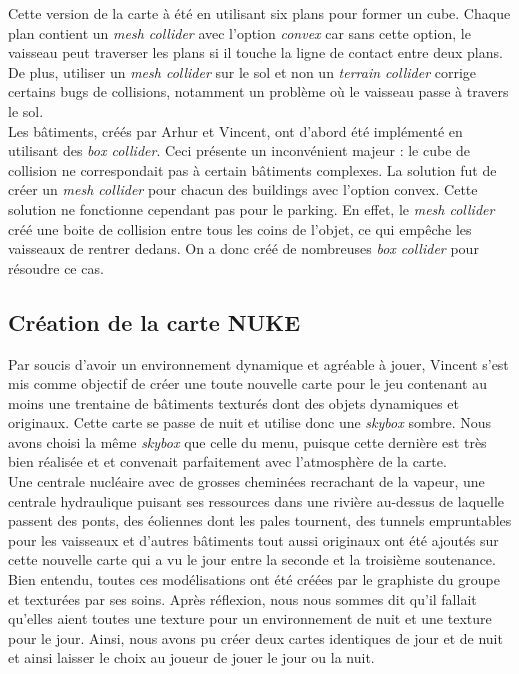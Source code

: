 \documentclass[12pt, titlepage]{article}
\begin{document}
\begin{spacing}{1.5}
Cette version de la carte à été en utilisant six plans pour former un cube. Chaque plan contient un \textit{mesh collider} avec l’option \textit{convex} car sans cette option, le vaisseau peut traverser les plans si il touche la ligne de contact entre deux plans. De plus, utiliser un \textit{mesh collider} sur le sol et non un \textit{terrain collider} corrige certains bugs de collisions, notamment un problème où le vaisseau passe à travers le sol.\\

Les bâtiments, créés par Arhur et Vincent, ont d'abord été implémenté en utilisant des \textit{box collider}. Ceci présente un inconvénient majeur : le cube de collision ne correspondait pas à certain bâtiments complexes. La solution fut de créer un \textit{mesh collider} pour chacun des buildings avec l'option convex. Cette solution ne fonctionne cependant pas pour le parking. En effet, le \textit{mesh collider} créé une boite de collision entre tous les coins de l'objet, ce qui empêche les vaisseaux de rentrer dedans. On a donc créé de nombreuses \textit{box collider} pour résoudre ce cas.

\subsection{Création de la carte NUKE }

Par soucis d'avoir un environnement dynamique et agréable à jouer, Vincent s’est mis comme objectif de créer une toute nouvelle carte pour le jeu contenant au moins une trentaine de bâtiments texturés dont des objets dynamiques et originaux. Cette carte se passe de nuit et utilise donc une \textit{skybox} sombre. Nous avons choisi la même \textit{skybox} que celle du menu, puisque cette dernière est très bien réalisée et et convenait parfaitement avec l'atmosphère de la carte.\\

Une centrale nucléaire avec de grosses cheminées recrachant de la vapeur, une centrale hydraulique puisant ses ressources dans une rivière au-dessus de laquelle passent des ponts, des éoliennes dont les pales tournent, des tunnels empruntables pour les vaisseaux et d’autres bâtiments tout aussi originaux ont été ajoutés sur cette nouvelle carte qui a vu le jour entre la seconde et la troisième soutenance. Bien entendu, toutes ces modélisations ont été créées par le graphiste du groupe et texturées par ses soins. Après réflexion, nous nous sommes dit qu'il fallait qu'elles aient toutes une texture pour un environnement de nuit et une texture pour le jour. Ainsi, nous avons pu créer deux cartes identiques de jour et de nuit et ainsi laisser le choix au joueur de jouer le jour ou la nuit.\\


\end{spacing}
\end{document}
